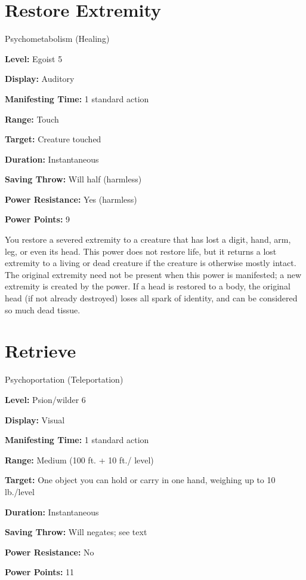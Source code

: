 \documentclass{article}
\begin{document}
\vspace{12pt}
\section*{Restore Extremity}

Psychometabolism (Healing)

\textbf{Level:} Egoist 5

\textbf{Display:} Auditory

\textbf{Manifesting Time:} 1 standard action

\textbf{Range:} Touch

\textbf{Target:} Creature touched

\textbf{Duration:} Instantaneous

\textbf{Saving Throw:} Will half (harmless)

\textbf{Power Resistance:} Yes (harmless)

\textbf{Power Points:} 9

You restore a severed extremity to a creature that has lost a digit, hand, arm, 
leg, or even its head. This power does not restore life, but it returns a lost 
extremity to a living or dead creature if the creature is otherwise mostly intact. 
The original extremity need not be present when this power is manifested; a new 
extremity is created by the power. If a head is restored to a body, the original 
head (if not already destroyed) loses all spark of identity, and can be considered 
so much dead tissue.

\vspace{12pt}
\section*{Retrieve}

Psychoportation (Teleportation)

\textbf{Level:} Psion/wilder 6

\textbf{Display:} Visual

\textbf{Manifesting Time:} 1 standard action

\textbf{Range:} Medium (100 ft. + 10 ft./ level)

\textbf{Target:} One object you can hold or carry in one hand, weighing up to 10 
lb./level

\textbf{Duration:} Instantaneous

\textbf{Saving Throw:} Will negates; see text

\textbf{Power Resistance:} No

\textbf{Power Points:} 11
\end{document}
